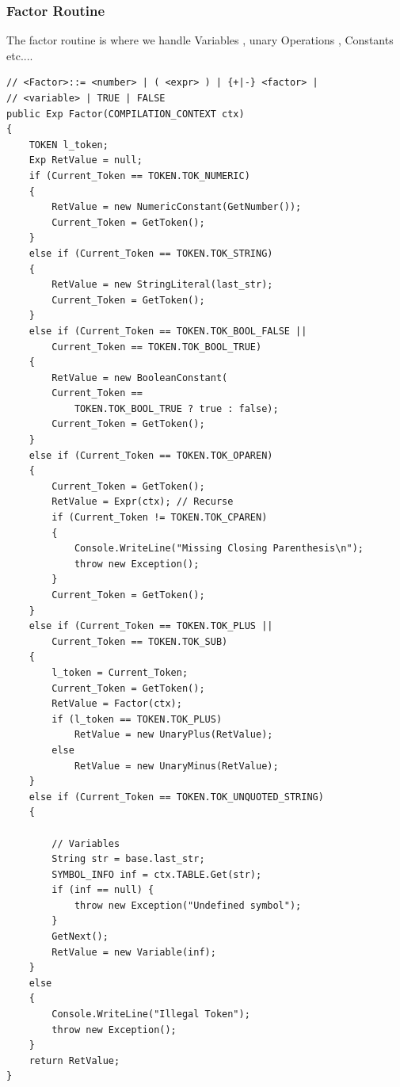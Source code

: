 \subsubsection{Factor Routine}
The factor routine is where we handle Variables , unary Operations , Constants etc....
\lstset{style=csharp}
\begin{lstlisting}
// <Factor>::= <number> | ( <expr> ) | {+|-} <factor> |
// <variable> | TRUE | FALSE
public Exp Factor(COMPILATION_CONTEXT ctx)
{
	TOKEN l_token;
	Exp RetValue = null;
	if (Current_Token == TOKEN.TOK_NUMERIC)
	{
		RetValue = new NumericConstant(GetNumber());
		Current_Token = GetToken();
	}
	else if (Current_Token == TOKEN.TOK_STRING)
	{
		RetValue = new StringLiteral(last_str);
		Current_Token = GetToken();
	}
	else if (Current_Token == TOKEN.TOK_BOOL_FALSE ||
		Current_Token == TOKEN.TOK_BOOL_TRUE)
	{
		RetValue = new BooleanConstant(
		Current_Token == 
			TOKEN.TOK_BOOL_TRUE ? true : false);
		Current_Token = GetToken();
	}
	else if (Current_Token == TOKEN.TOK_OPAREN)
	{
		Current_Token = GetToken();
		RetValue = Expr(ctx); // Recurse
		if (Current_Token != TOKEN.TOK_CPAREN)
		{
			Console.WriteLine("Missing Closing Parenthesis\n");
			throw new Exception();
		}
		Current_Token = GetToken();
	}
	else if (Current_Token == TOKEN.TOK_PLUS || 
		Current_Token == TOKEN.TOK_SUB)
	{
		l_token = Current_Token;
		Current_Token = GetToken();
		RetValue = Factor(ctx);
		if (l_token == TOKEN.TOK_PLUS)
			RetValue = new UnaryPlus(RetValue);
		else
			RetValue = new UnaryMinus(RetValue);
	}
	else if (Current_Token == TOKEN.TOK_UNQUOTED_STRING)
	{
		
		// Variables
		String str = base.last_str;
		SYMBOL_INFO inf = ctx.TABLE.Get(str);
		if (inf == null) {
			throw new Exception("Undefined symbol");
		}
		GetNext();
		RetValue = new Variable(inf);
	}
	else
	{
		Console.WriteLine("Illegal Token");
		throw new Exception();
	}
	return RetValue;
}
\end{lstlisting}
